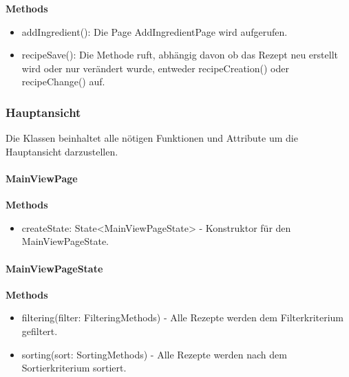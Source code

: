 \documentclass[parskip=full]{scrartcl}
\begin{document}
            \textbf{Methods}
                \begin{itemize}
                    \item addIngredient(): Die Page AddIngredientPage wird aufgerufen.
                    \item recipeSave(): Die Methode ruft, abhängig davon ob das Rezept neu erstellt wird oder nur verändert wurde, entweder recipeCreation() oder recipeChange() auf.
                \end{itemize}


    \newpage


\subsubsection{Hauptansicht}
        Die Klassen beinhaltet alle nötigen Funktionen und Attribute um die Hauptansicht darzustellen.\newline

        \paragraph{MainViewPage}
            \textbf{Methods}
                \begin{itemize}
                    \item createState: State<MainViewPageState> - Konstruktor für den MainViewPageState.
                \end{itemize}
                
        \paragraph{MainViewPageState}
            \textbf{Methods}
                \begin{itemize}
                    \item filtering(filter: FilteringMethods) - Alle Rezepte werden dem Filterkriterium gefiltert.
                    \item sorting(sort: SortingMethods) - Alle Rezepte werden nach dem Sortierkriterium sortiert.
                \end{itemize}
\end{document}

